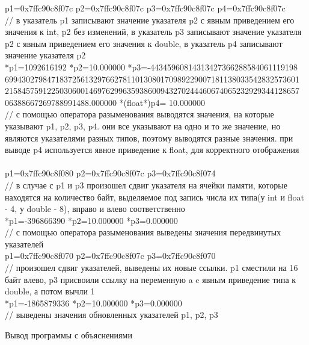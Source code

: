 \documentclass[a4paper,14pt]{extarticle}
\begin{document}
p1=0x7ffc90c8f07c	p2=0x7ffc90c8f07c	p3=0x7ffc90c8f07c	p4=0x7ffc90c8f07c\\
// в указатель p1 записывают значение указателя p2 с явным приведением его значения к int, p2 без изменений, в указатель p3 записывают значение указателя p2 с явным приведением его значения к double, в указатель p4 записывают значение указателя p2\\
*p1=1092616192	*p2=10.000000	*p3=-44345960814313427366288584061119198\\6994302798471837256132976627811013080170989229007181138033542832573601\\2158457591225030600146976299635938600943270244460674065232929344128657\\06388667269788991488.000000	*(float*)p4=  10.000000\\
// с помощью оператора разыменования выводятся значения, на которые указывают p1, p2, p3, p4. они все указывают на одно и то же значение, но являются указателями разных типов, поэтому выводятся разные значения. при выводе p4 используется явное приведение к float, для корректного отображения\\
\\
p1=0x7ffc90c8f080	p2=0x7ffc90c8f07c	p3=0x7ffc90c8f074\\
// в случае с p1 и p3 произошел сдвиг указателя на ячейки памяти, которые находятся на количество байт, выделяемое под запись числа их типа(у int и float - 4, у double - 8), вправо и влево соответственно\\
*p1=-396866390		*p2=10.000000	*p3=0.000000\\
// с помощью оператора разыменования выведены значения передвинутых указателей\\
p1=0x7ffc90c8f070	p2=0x7ffc90c8f07c	p3=0x7ffc90c8f070\\
// произошел сдвиг указателей, выведены их новые ссылки. p1 сместили на 16 байт влево, p3 присвоили ссылку на переменную a c явным приведение типа к double, а потом вычли 1\\
*p1=-1865879336	*p2=10.000000	*p3=0.000000\\
// выведены значения обновленных указателей p1, p2, p3\\
\begin{center}
Вывод программы с объяснениями
\end{center}
\end{document}
